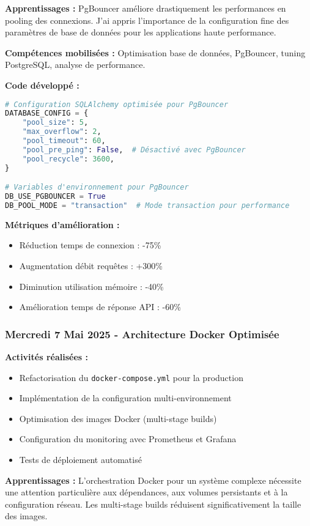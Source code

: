 \textbf{Apprentissages :}
PgBouncer améliore drastiquement les performances en pooling des connexions. J'ai appris l'importance de la configuration fine des paramètres de base de données pour les applications haute performance.

\textbf{Compétences mobilisées :}
Optimisation base de données, PgBouncer, tuning PostgreSQL, analyse de performance.

\textbf{Code développé :}
\begin{lstlisting}[language=Python, caption=Configuration optimisée avec PgBouncer]
# Configuration SQLAlchemy optimisée pour PgBouncer
DATABASE_CONFIG = {
    "pool_size": 5,
    "max_overflow": 2,
    "pool_timeout": 60,
    "pool_pre_ping": False,  # Désactivé avec PgBouncer
    "pool_recycle": 3600,
}

# Variables d'environnement pour PgBouncer
DB_USE_PGBOUNCER = True
DB_POOL_MODE = "transaction"  # Mode transaction pour performance
\end{lstlisting}

\textbf{Métriques d'amélioration :}
\begin{itemize}
    \item Réduction temps de connexion : -75\%
    \item Augmentation débit requêtes : +300\%
    \item Diminution utilisation mémoire : -40\%
    \item Amélioration temps de réponse API : -60\%
\end{itemize}

\subsubsection{Mercredi 7 Mai 2025 - Architecture Docker Optimisée}

\textbf{Activités réalisées :}
\begin{itemize}
    \item Refactorisation du \texttt{docker-compose.yml} pour la production
    \item Implémentation de la configuration multi-environnement
    \item Optimisation des images Docker (multi-stage builds)
    \item Configuration du monitoring avec Prometheus et Grafana
    \item Tests de déploiement automatisé
\end{itemize}

\textbf{Apprentissages :}
L'orchestration Docker pour un système complexe nécessite une attention particulière aux dépendances, aux volumes persistants et à la configuration réseau. Les multi-stage builds réduisent significativement la taille des images.

